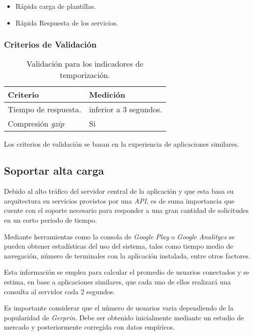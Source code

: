 \begin{itemize}
	\item
	Rápida carga de plantillas.
	\item
	Rápida Respuesta de los servicios.
\end{itemize}

\subsubsection{Criterios de Validación}

\begin{table}[H]
    \caption[Validación para los indicadores de temporización.] {Validación para los indicadores de temporización.}
    \label{tbl:Criterios de Validación temporización}
    \begin{tabular}{|p{}|p{}|}
        \hline
        \textbf{Criterio} &  \textbf{Medición}\\
    	\hline
    	\hline
    	Tiempo de respuesta.  & inferior a 3 segundos. \\ \hline
		Compresión \emph{gzip}   & Si \\ 
        \hline
    \end{tabular}
\end{table}
Los criterios de validación se basan en la experiencia de aplicaciones similares.

\subsection{Soportar alta carga}

Debido al alto tráfico del servidor central de la aplicación y que esta basa su arquitectura en servicios provistos por una \emph{API}, es de suma importancia que cuente con el soporte necesario para responder a una gran cantidad de solicitudes en un corto periodo de tiempo.

Mediante herramientas como la consola de \emph{Google Play} o \emph{ Google Analitycs} se pueden obtener estadísticas del uso del sistema, tales como tiempo medio de navegación, número de terminales con la aplicación instalada, entre otros factores.

Esta información se emplea para calcular el promedio de usuarios conectados y se estima, en base a aplicaciones similares, que cada uno de ellos realizará una consulta al servidor cada 2 segundos.

Es importante considerar que el número de usuarios varia dependiendo de la popularidad de \emph{Gerprin}. Debe ser obtenido inicialmente mediante un estudio de mercado y posteriormente corregida con datos empíricos.


